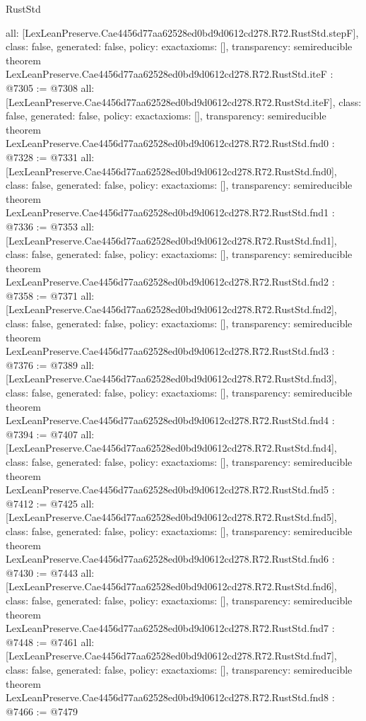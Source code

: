 \begin{lexlean}{RustStd}
\begin{coremodule}
{  all: [LexLeanPreserve.Cae4456d77aa62528ed0bd9d0612cd278.R72.RustStd.stepF],
  class: false,
  generated: false,
  policy: exact{axioms: []},
  transparency: semireducible
}
theorem LexLeanPreserve.Cae4456d77aa62528ed0bd9d0612cd278.R72.RustStd.iteF : @7305 := @7308 {
  all: [LexLeanPreserve.Cae4456d77aa62528ed0bd9d0612cd278.R72.RustStd.iteF],
  class: false,
  generated: false,
  policy: exact{axioms: []},
  transparency: semireducible
}
theorem LexLeanPreserve.Cae4456d77aa62528ed0bd9d0612cd278.R72.RustStd.fnd0 : @7328 := @7331 {
  all: [LexLeanPreserve.Cae4456d77aa62528ed0bd9d0612cd278.R72.RustStd.fnd0],
  class: false,
  generated: false,
  policy: exact{axioms: []},
  transparency: semireducible
}
theorem LexLeanPreserve.Cae4456d77aa62528ed0bd9d0612cd278.R72.RustStd.fnd1 : @7336 := @7353 {
  all: [LexLeanPreserve.Cae4456d77aa62528ed0bd9d0612cd278.R72.RustStd.fnd1],
  class: false,
  generated: false,
  policy: exact{axioms: []},
  transparency: semireducible
}
theorem LexLeanPreserve.Cae4456d77aa62528ed0bd9d0612cd278.R72.RustStd.fnd2 : @7358 := @7371 {
  all: [LexLeanPreserve.Cae4456d77aa62528ed0bd9d0612cd278.R72.RustStd.fnd2],
  class: false,
  generated: false,
  policy: exact{axioms: []},
  transparency: semireducible
}
theorem LexLeanPreserve.Cae4456d77aa62528ed0bd9d0612cd278.R72.RustStd.fnd3 : @7376 := @7389 {
  all: [LexLeanPreserve.Cae4456d77aa62528ed0bd9d0612cd278.R72.RustStd.fnd3],
  class: false,
  generated: false,
  policy: exact{axioms: []},
  transparency: semireducible
}
theorem LexLeanPreserve.Cae4456d77aa62528ed0bd9d0612cd278.R72.RustStd.fnd4 : @7394 := @7407 {
  all: [LexLeanPreserve.Cae4456d77aa62528ed0bd9d0612cd278.R72.RustStd.fnd4],
  class: false,
  generated: false,
  policy: exact{axioms: []},
  transparency: semireducible
}
theorem LexLeanPreserve.Cae4456d77aa62528ed0bd9d0612cd278.R72.RustStd.fnd5 : @7412 := @7425 {
  all: [LexLeanPreserve.Cae4456d77aa62528ed0bd9d0612cd278.R72.RustStd.fnd5],
  class: false,
  generated: false,
  policy: exact{axioms: []},
  transparency: semireducible
}
theorem LexLeanPreserve.Cae4456d77aa62528ed0bd9d0612cd278.R72.RustStd.fnd6 : @7430 := @7443 {
  all: [LexLeanPreserve.Cae4456d77aa62528ed0bd9d0612cd278.R72.RustStd.fnd6],
  class: false,
  generated: false,
  policy: exact{axioms: []},
  transparency: semireducible
}
theorem LexLeanPreserve.Cae4456d77aa62528ed0bd9d0612cd278.R72.RustStd.fnd7 : @7448 := @7461 {
  all: [LexLeanPreserve.Cae4456d77aa62528ed0bd9d0612cd278.R72.RustStd.fnd7],
  class: false,
  generated: false,
  policy: exact{axioms: []},
  transparency: semireducible
}
theorem LexLeanPreserve.Cae4456d77aa62528ed0bd9d0612cd278.R72.RustStd.fnd8 : @7466 := @7479 {
}
\end{coremodule}
\end{lexlean}
